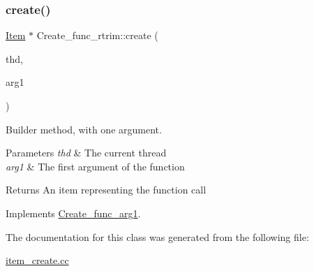 \subsubsection{\texorpdfstring{create()}{create()}}
{\footnotesize\ttfamily \mbox{\hyperlink{classItem}{Item}} $\ast$ Create\+\_\+func\+\_\+rtrim\+::create (\begin{DoxyParamCaption}\item[{T\+HD $\ast$}]{thd,  }\item[{\mbox{\hyperlink{classItem}{Item}} $\ast$}]{arg1 }\end{DoxyParamCaption})\hspace{0.3cm}{\ttfamily [virtual]}}

Builder method, with one argument. 
\begin{DoxyParams}{Parameters}
{\em thd} & The current thread \\
\hline
{\em arg1} & The first argument of the function \\
\hline
\end{DoxyParams}
\begin{DoxyReturn}{Returns}
An item representing the function call 
\end{DoxyReturn}


Implements \mbox{\hyperlink{classCreate__func__arg1_a3e9a98f755cd82c3e762e334c955a8c9}{Create\+\_\+func\+\_\+arg1}}.



The documentation for this class was generated from the following file\+:\begin{DoxyCompactItemize}
\item 
\mbox{\hyperlink{item__create_8cc}{item\+\_\+create.\+cc}}\end{DoxyCompactItemize}
